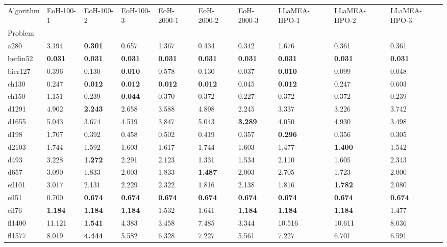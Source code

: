 \begin{tabular}{llllllllll}
\toprule
Algorithm & EoH-100-1 & EoH-100-2 & EoH-100-3 & EoH-2000-1 & EoH-2000-2 & EoH-2000-3 & LLaMEA-HPO-1 & LLaMEA-HPO-2 & LLaMEA-HPO-3 \\
Problem &  &  &  &  &  &  &  &  &  \\
\midrule
a280 & 3.194 & \textbf{0.301} & 0.657 & 1.367 & 0.434 & 0.342 & 1.676 & 0.361 & 0.361 \\
berlin52 & \textbf{0.031} & \textbf{0.031} & \textbf{0.031} & \textbf{0.031} & \textbf{0.031} & \textbf{0.031} & \textbf{0.031} & \textbf{0.031} & \textbf{0.031} \\
bier127 & 0.396 & 0.130 & \textbf{0.010} & 0.578 & 0.130 & 0.037 & \textbf{0.010} & 0.099 & 0.048 \\
ch130 & 0.247 & \textbf{0.012} & \textbf{0.012} & \textbf{0.012} & \textbf{0.012} & 0.045 & \textbf{0.012} & 0.247 & 0.603 \\
ch150 & 1.151 & 0.239 & \textbf{0.044} & 0.370 & 0.372 & 0.227 & 0.372 & 0.372 & 0.239 \\
d1291 & 4.902 & \textbf{2.243} & 2.658 & 3.588 & 4.898 & 2.245 & 3.337 & 3.226 & 3.742 \\
d1655 & 5.043 & 3.674 & 4.519 & 3.847 & 5.043 & \textbf{3.289} & 4.050 & 4.930 & 3.498 \\
d198 & 1.707 & 0.392 & 0.458 & 0.502 & 0.419 & 0.357 & \textbf{0.296} & 0.356 & 0.305 \\
d2103 & 1.744 & 1.592 & 1.603 & 1.617 & 1.744 & 1.603 & 1.477 & \textbf{1.400} & 1.542 \\
d493 & 3.228 & \textbf{1.272} & 2.291 & 2.123 & 1.331 & 1.534 & 2.110 & 1.605 & 2.343 \\
d657 & 3.090 & 1.833 & 2.003 & 1.833 & \textbf{1.487} & 2.003 & 2.705 & 1.723 & 2.000 \\
eil101 & 3.017 & 2.131 & 2.229 & 2.322 & 1.816 & 2.138 & 1.816 & \textbf{1.782} & 2.080 \\
eil51 & 0.700 & \textbf{0.674} & \textbf{0.674} & \textbf{0.674} & \textbf{0.674} & \textbf{0.674} & \textbf{0.674} & \textbf{0.674} & \textbf{0.674} \\
eil76 & \textbf{1.184} & \textbf{1.184} & \textbf{1.184} & 1.532 & 1.641 & \textbf{1.184} & \textbf{1.184} & \textbf{1.184} & 1.477 \\
fl1400 & 11.121 & \textbf{1.541} & 4.383 & 3.458 & 7.485 & 3.344 & 10.516 & 10.611 & 8.036 \\
fl1577 & 8.019 & \textbf{4.444} & 5.582 & 6.328 & 7.227 & 5.561 & 7.227 & 6.701 & 6.591 \\

\end{tabular}

